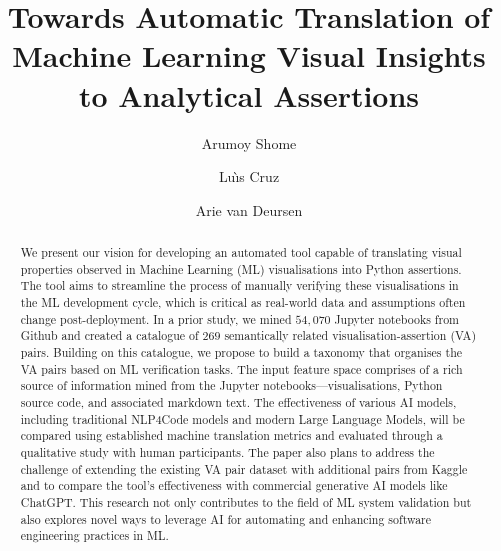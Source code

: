 \documentclass[sigconf]{acmart}
\begin{document}
\title{Towards Automatic Translation of Machine Learning Visual
Insights to Analytical Assertions}


\author{Arumoy Shome}

\author{Lu{\`\i}s Cruz}

\author{Arie van Deursen}

\begin{abstract}

We present our vision for developing an automated tool capable of
translating visual properties observed in Machine Learning (ML)
visualisations into Python assertions. The tool aims to streamline the
process of manually verifying these visualisations in the ML
development cycle, which is critical as real-world data and
assumptions often change post-deployment. In a prior study, we mined
$54,070$ Jupyter notebooks from Github and created a catalogue of
$269$ semantically related visualisation-assertion (VA) pairs.
Building on this catalogue, we propose to build a taxonomy that
organises the VA pairs based on ML verification tasks. The input
feature space comprises of a rich source of information mined from the
Jupyter notebooks---visualisations, Python source code, and associated
markdown text. The effectiveness of various AI models, including
traditional NLP4Code models and modern Large Language Models, will be
compared using established machine translation metrics and evaluated
through a qualitative study with human participants. The paper also
plans to address the challenge of extending the existing VA pair
dataset with additional pairs from Kaggle and to compare the tool's
effectiveness with commercial generative AI models like ChatGPT. This
research not only contributes to the field of ML system validation but
also explores novel ways to leverage AI for automating and enhancing
software engineering practices in ML.

\end{abstract}
\end{document}
